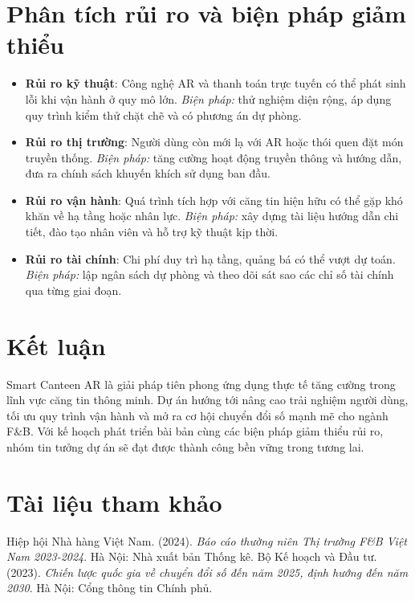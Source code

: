 \documentclass[12pt,a4paper]{article}
\begin{document}
\begin{itemize}[label=\textbullet]
\section{Phân tích rủi ro và biện pháp giảm thiểu}
\begin{riskbox}
\begin{itemize}
    \item \textbf{Rủi ro kỹ thuật}: Công nghệ AR và thanh toán trực tuyến có thể
    phát sinh lỗi khi vận hành ở quy mô lớn. \textit{Biện pháp:} thử nghiệm diện
    rộng, áp dụng quy trình kiểm thử chặt chẽ và có phương án dự phòng.
    \item \textbf{Rủi ro thị trường}: Người dùng còn mới lạ với AR hoặc thói quen
    đặt món truyền thống. \textit{Biện pháp:} tăng cường hoạt động truyền thông
    và hướng dẫn, đưa ra chính sách khuyến khích sử dụng ban đầu.
    \item \textbf{Rủi ro vận hành}: Quá trình tích hợp với căng tin hiện hữu có thể
    gặp khó khăn về hạ tầng hoặc nhân lực. \textit{Biện pháp:} xây dựng tài liệu
    hướng dẫn chi tiết, đào tạo nhân viên và hỗ trợ kỹ thuật kịp thời.
    \item \textbf{Rủi ro tài chính}: Chi phí duy trì hạ tầng, quảng bá có thể vượt
    dự toán. \textit{Biện pháp:} lập ngân sách dự phòng và theo dõi sát sao các
    chỉ số tài chính qua từng giai đoạn.
\end{itemize}
\end{riskbox}

\section{Kết luận}
Smart Canteen AR là giải pháp tiên phong ứng dụng thực tế tăng cường trong lĩnh
vực căng tin thông minh. Dự án hướng tới nâng cao trải nghiệm người dùng, tối ưu
quy trình vận hành và mở ra cơ hội chuyển đổi số mạnh mẽ cho ngành F\&B. Với kế
hoạch phát triển bài bản cùng các biện pháp giảm thiểu rủi ro, nhóm tin tưởng dự
án sẽ đạt được thành công bền vững trong tương lai.

\clearpage %
\section{Tài liệu tham khảo}
\begin{thebibliography}{99} %
    Hiệp hội Nhà hàng Việt Nam. (2024). \textit{Báo cáo thường niên Thị trường F\&B Việt Nam 2023-2024}. Hà Nội: Nhà xuất bản Thống kê.
    Bộ Kế hoạch và Đầu tư. (2023). \textit{Chiến lược quốc gia về chuyển đổi số đến năm 2025, định hướng đến năm 2030}. Hà Nội: Cổng thông tin Chính phủ.


\end{thebibliography}
\end{itemize}
\end{document}
